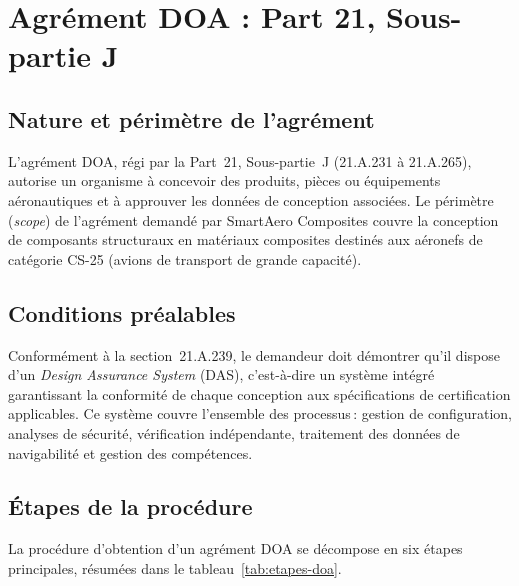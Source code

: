 \documentclass[12pt,a4paper]{article}
\begin{document}
\section{Agrément DOA : Part 21, Sous-partie J}

\subsection{Nature et périmètre de l'agrément}

L'agrément DOA, régi par la Part~21, Sous-partie~J (21.A.231 à 21.A.265), autorise un organisme à concevoir des produits, pièces ou équipements aéronautiques et à approuver les données de conception associées. Le périmètre (\textit{scope}) de l'agrément demandé par SmartAero Composites couvre la conception de composants structuraux en matériaux composites destinés aux aéronefs de catégorie CS-25 (avions de transport de grande capacité).

\subsection{Conditions préalables}

Conformément à la section~21.A.239, le demandeur doit démontrer qu'il dispose d'un \textit{Design Assurance System} (DAS), c'est-à-dire un système intégré garantissant la conformité de chaque conception aux spécifications de certification applicables. Ce système couvre l'ensemble des processus\,: gestion de configuration, analyses de sécurité, vérification indépendante, traitement des données de navigabilité et gestion des compétences.

\subsection{Étapes de la procédure}

La procédure d'obtention d'un agrément DOA se décompose en six étapes principales, résumées dans le tableau~\ref{tab:etapes-doa}.
\end{document}
